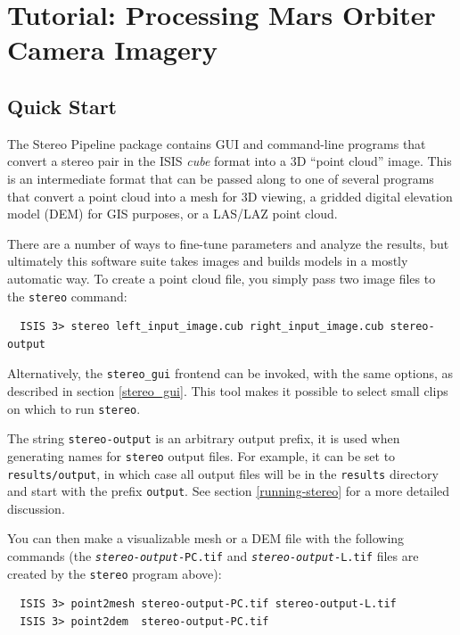 \chapter{Tutorial: Processing Mars Orbiter Camera Imagery}
\label{ch:moc_tutorial}


\section{Quick Start}
\label{quickstart}

The Stereo Pipeline package contains GUI and command-line programs that
convert a stereo pair in the ISIS {\em cube} format into a 3D ``point
cloud'' image.  This is an intermediate format that can be passed along
to one of several programs that convert a point cloud into a mesh for 3D
viewing, a gridded digital elevation model (DEM) for GIS purposes, or a
LAS/LAZ point cloud.

There are a number of ways to fine-tune parameters and analyze the
results, but ultimately this software suite takes images and builds
models in a mostly automatic way.  To create a point cloud file, you
simply pass two image files to the \texttt{stereo} command:

\begin{verbatim}
  ISIS 3> stereo left_input_image.cub right_input_image.cub stereo-output
\end{verbatim}

Alternatively, the \texttt{stereo\_gui} frontend can be invoked, with
the same options, as described in section \ref{stereo_gui}. This tool
makes it possible to select small clips on which to run \texttt{stereo}.

The string \texttt{stereo-output} is an arbitrary output prefix, it is
used when generating names for \texttt{stereo} output files. For
example, it can be set to \texttt{results/output}, in which case all
output files will be in the \texttt{results} directory and start with
the prefix \texttt{output}. See section \ref{running-stereo} for a more
detailed discussion.

You can then make a visualizable mesh or a \ac{DEM} file with the following
commands (the \texttt{\textit{stereo-output}-PC.tif} and
\texttt{\textit{stereo-output}-L.tif} files are created by the
\texttt{stereo} program above):

\begin{verbatim}
  ISIS 3> point2mesh stereo-output-PC.tif stereo-output-L.tif
  ISIS 3> point2dem  stereo-output-PC.tif
\end{verbatim}

